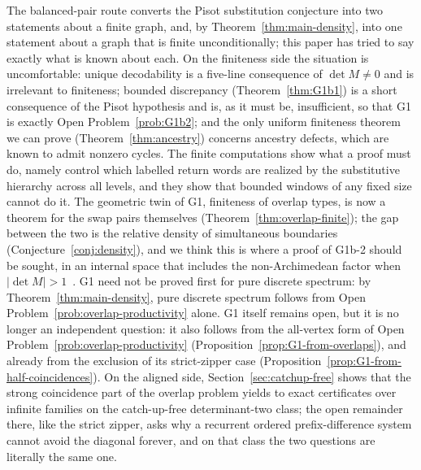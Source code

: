 \documentclass[11pt]{amsart}
\theoremstyle{plain}
\theoremstyle{definition}
\theoremstyle{remark}
\newcommand{\PDS}{pure discrete spectrum}
\begin{document}
The balanced-pair route converts the Pisot substitution conjecture into two statements about a finite graph, and, by Theorem~\ref{thm:main-density}, into one statement about a graph that is finite unconditionally; this paper has tried to say exactly what is known about each. On the finiteness side the situation is uncomfortable: unique decodability is a five-line consequence of $\det M\ne0$ and is irrelevant to finiteness; bounded discrepancy (Theorem~\ref{thm:G1b1}) is a short consequence of the Pisot hypothesis and is, as it must be, insufficient, so that G1 is exactly Open Problem~\ref{prob:G1b2}; and the only uniform finiteness theorem we can prove (Theorem~\ref{thm:ancestry}) concerns ancestry defects, which are known to admit nonzero cycles. The finite computations show what a proof must do, namely control which labelled return words are realized by the substitutive hierarchy across all levels, and they show that bounded windows of any fixed size cannot do it. The geometric twin of G1, finiteness of overlap types, is now a theorem for the swap pairs themselves (Theorem~\ref{thm:overlap-finite}); the gap between the two is the relative density of simultaneous boundaries (Conjecture~\ref{conj:density}), and we think this is where a proof of G1b-2 should be sought, in an internal space that includes the non-Archimedean factor when $|\det M|>1$~\cite{MT}. G1 need not be proved first for \PDS{}: by Theorem~\ref{thm:main-density}, \PDS{} follows from Open Problem~\ref{prob:overlap-productivity} alone. G1 itself remains open, but it is no longer an independent question: it also follows from the all-vertex form of Open Problem~\ref{prob:overlap-productivity} (Proposition~\ref{prop:G1-from-overlaps}), and already from the exclusion of its strict-zipper case (Proposition~\ref{prop:G1-from-half-coincidences}). On the aligned side, Section~\ref{sec:catchup-free} shows that the strong coincidence part of the overlap problem yields to exact certificates over infinite families on the catch-up-free determinant-two class; the open remainder there, like the strict zipper, asks why a recurrent ordered prefix-difference system cannot avoid the diagonal forever, and on that class the two questions are literally the same one.
\end{document}
